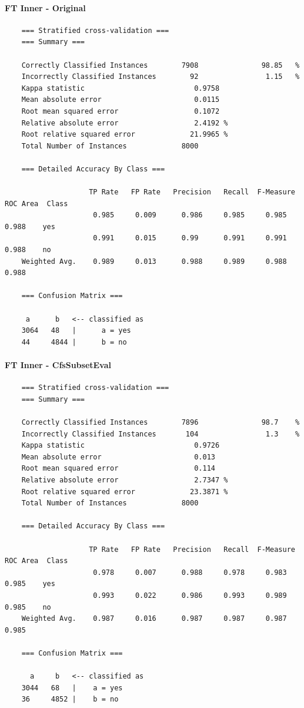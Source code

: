 \paragraph{FT Inner - Original}
{\footnotesize
	\begin{verbatim}
	=== Stratified cross-validation ===
	=== Summary ===
	
	Correctly Classified Instances        7908               98.85   %
	Incorrectly Classified Instances        92                1.15   %
	Kappa statistic                          0.9758
	Mean absolute error                      0.0115
	Root mean squared error                  0.1072
	Relative absolute error                  2.4192 %
	Root relative squared error             21.9965 %
	Total Number of Instances             8000     
	
	=== Detailed Accuracy By Class ===
	
	                TP Rate   FP Rate   Precision   Recall  F-Measure   ROC Area  Class
	                 0.985     0.009      0.986     0.985     0.985      0.988    yes
	                 0.991     0.015      0.99      0.991     0.991      0.988    no
	Weighted Avg.    0.989     0.013      0.988     0.989     0.988      0.988
	
	=== Confusion Matrix ===
	
	 a      b   <-- classified as
	3064   48   |      a = yes
	44     4844 |      b = no
	\end{verbatim}
}

\paragraph{FT Inner - CfsSubsetEval}
{\footnotesize
	\begin{verbatim}
	=== Stratified cross-validation ===
	=== Summary ===
	
	Correctly Classified Instances        7896               98.7    %
	Incorrectly Classified Instances       104                1.3    %
	Kappa statistic                          0.9726
	Mean absolute error                      0.013 
	Root mean squared error                  0.114 
	Relative absolute error                  2.7347 %
	Root relative squared error             23.3871 %
	Total Number of Instances             8000     
	
	=== Detailed Accuracy By Class ===
	
	                TP Rate   FP Rate   Precision   Recall  F-Measure   ROC Area  Class
	                 0.978     0.007      0.988     0.978     0.983      0.985    yes
	                 0.993     0.022      0.986     0.993     0.989      0.985    no
	Weighted Avg.    0.987     0.016      0.987     0.987     0.987      0.985
	
	=== Confusion Matrix ===
	
	  a     b   <-- classified as
	3044   68   |    a = yes
	36     4852 |    b = no	
	\end{verbatim}
}

